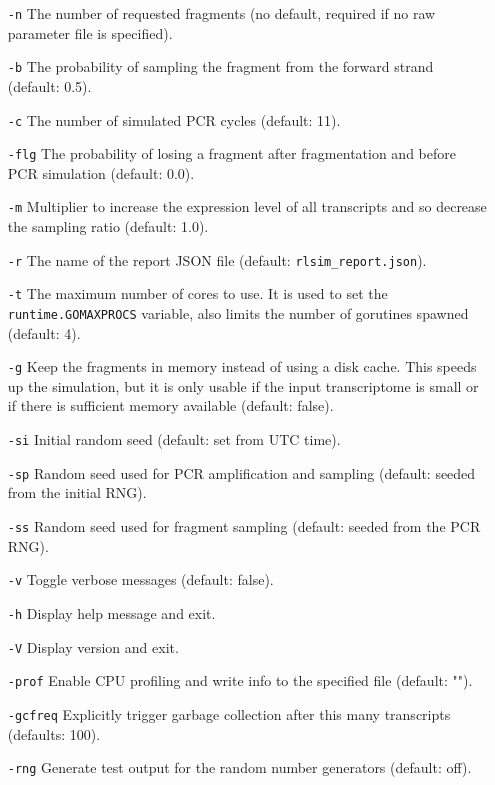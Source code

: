 \begin{itemize}
    \item[\texttt{-n}]{The number of requested fragments (no default, required if no raw parameter file is specified).}
    \item[\texttt{-b}]{The probability of sampling the fragment from the forward strand (default: 0.5).}
    \item[\texttt{-c}]{The number of simulated PCR cycles (default: 11).}
    \item[\texttt{-flg}]{The probability of losing a fragment after fragmentation and before PCR simulation (default: 0.0).}
    \item[\texttt{-m}]{Multiplier to increase the expression level of all transcripts and so decrease the sampling ratio (default: 1.0).}
    \item[\texttt{-r}]{The name of the report JSON file (default: \texttt{rlsim\_report.json}).}
    \item[\texttt{-t}]{The maximum number of cores to use. It is used to set the \texttt{runtime.GOMAXPROCS} variable, also limits the number of gorutines spawned (default: 4).}
    \item[\texttt{-g}]{Keep the fragments in memory instead of using a disk cache. This speeds up the simulation, but it is only usable if the input transcriptome is small or if there is sufficient memory available (default: false).}
    \item[\texttt{-si}]{Initial random seed (default: set from UTC time).}
    \item[\texttt{-sp}]{Random seed used for PCR amplification and sampling (default: seeded from the initial RNG).}
    \item[\texttt{-ss}]{Random seed used for fragment sampling (default: seeded from the PCR RNG).}
    \item[\texttt{-v}]{Toggle verbose messages (default: false).}
    \item[\texttt{-h}]{Display help message and exit.}
    \item[\texttt{-V}]{Display version and exit.}
    \item[\texttt{-prof}]{Enable CPU profiling and write info to the specified file (default: "").}
    \item[\texttt{-gcfreq}]{Explicitly trigger garbage collection after this many transcripts (defaults: 100).}
    \item[\texttt{-rng}]{Generate test output for the random number generators (default: off).}
\end{itemize}

